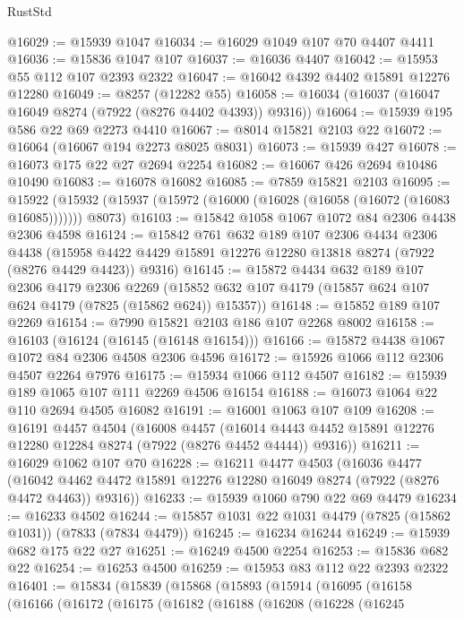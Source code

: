 \begin{lexlean}{RustStd}
\begin{coremodule}
@16029 := @15939 @1047
@16034 := @16029 @1049 @107 @70 @4407 @4411
@16036 := @15836 @1047 @107
@16037 := @16036 @4407
@16042 := @15953 @55 @112 @107 @2393 @2322
@16047 := @16042 @4392 @4402 @15891 @12276 @12280
@16049 := @8257 (@12282 @55)
@16058 := @16034 (@16037 (@16047 @16049 @8274 (@7922 (@8276 @4402 @4393)) @9316))
@16064 := @15939 @195 @586 @22 @69 @2273 @4410
@16067 := @8014 @15821 @2103 @22
@16072 := @16064 (@16067 @194 @2273 @8025 @8031)
@16073 := @15939 @427
@16078 := @16073 @175 @22 @27 @2694 @2254
@16082 := @16067 @426 @2694 @10486 @10490
@16083 := @16078 @16082
@16085 := @7859 @15821 @2103
@16095 := @15922
    (@15932 (@15937 (@15972 (@16000 (@16028 (@16058 (@16072 (@16083 @16085))))))) @8073)
@16103 := @15842 @1058 @1067 @1072 @84 @2306 @4438 @2306 @4598
@16124 := @15842
    @761
    @632
    @189
    @107
    @2306
    @4434
    @2306
    @4438
    (@15958 @4422 @4429 @15891 @12276 @12280 @13818 @8274 (@7922 (@8276 @4429 @4423)) @9316)
@16145 := @15872
    @4434
    @632
    @189
    @107
    @2306
    @4179
    @2306
    @2269
    (@15852 @632 @107 @4179 (@15857 @624 @107 @624 @4179 (@7825 (@15862 @624)) @15357))
@16148 := @15852 @189 @107 @2269
@16154 := @7990 @15821 @2103 @186 @107 @2268 @8002
@16158 := @16103 (@16124 (@16145 (@16148 @16154)))
@16166 := @15872 @4438 @1067 @1072 @84 @2306 @4508 @2306 @4596
@16172 := @15926 @1066 @112 @2306 @4507 @2264 @7976
@16175 := @15934 @1066 @112 @4507
@16182 := @15939 @189 @1065 @107 @111 @2269 @4506 @16154
@16188 := @16073 @1064 @22 @110 @2694 @4505 @16082
@16191 := @16001 @1063 @107 @109
@16208 := @16191
    @4457
    @4504
    (@16008
      @4457
      (@16014 @4443 @4452 @15891 @12276 @12280 @12284 @8274 (@7922 (@8276 @4452 @4444)) @9316))
@16211 := @16029 @1062 @107 @70
@16228 := @16211
    @4477
    @4503
    (@16036
      @4477
      (@16042 @4462 @4472 @15891 @12276 @12280 @16049 @8274 (@7922 (@8276 @4472 @4463)) @9316))
@16233 := @15939 @1060 @790 @22 @69 @4479
@16234 := @16233 @4502
@16244 := @15857 @1031 @22 @1031 @4479 (@7825 (@15862 @1031)) (@7833 (@7834 @4479))
@16245 := @16234 @16244
@16249 := @15939 @682 @175 @22 @27
@16251 := @16249 @4500 @2254
@16253 := @15836 @682 @22
@16254 := @16253 @4500
@16259 := @15953 @83 @112 @22 @2393 @2322
@16401 := @15834
    (@15839
      (@15868
        (@15893
          (@15914
            (@16095
              (@16158
                (@16166
                  (@16172
                    (@16175
                      (@16182
                        (@16188
                          (@16208
                            (@16228
                              (@16245

\end{coremodule}
\end{lexlean}
